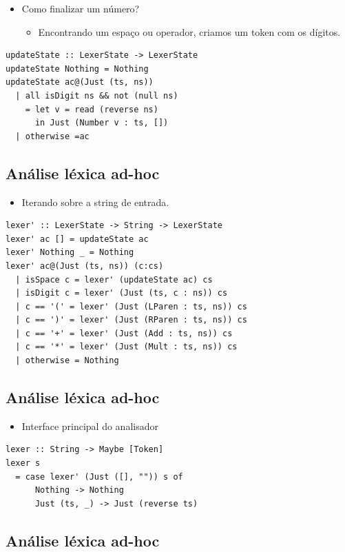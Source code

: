 \documentclass[11pt]{article}
\begin{document}
\begin{itemize}
\item Como finalizar um número?
\begin{itemize}
\item Encontrando um espaço ou operador, criamos um token
com os dígitos.
\end{itemize}
\end{itemize}

\begin{verbatim}
updateState :: LexerState -> LexerState
updateState Nothing = Nothing
updateState ac@(Just (ts, ns))
  | all isDigit ns && not (null ns)
    = let v = read (reverse ns)
      in Just (Number v : ts, [])
  | otherwise =ac
\end{verbatim}
\subsection*{Análise léxica ad-hoc}
\label{sec:org06bc440}

\begin{itemize}
\item Iterando sobre a string de entrada.
\end{itemize}

\begin{verbatim}
lexer' :: LexerState -> String -> LexerState
lexer' ac [] = updateState ac
lexer' Nothing _ = Nothing
lexer' ac@(Just (ts, ns)) (c:cs)
  | isSpace c = lexer' (updateState ac) cs
  | isDigit c = lexer' (Just (ts, c : ns)) cs
  | c == '(' = lexer' (Just (LParen : ts, ns)) cs
  | c == ')' = lexer' (Just (RParen : ts, ns)) cs
  | c == '+' = lexer' (Just (Add : ts, ns)) cs
  | c == '*' = lexer' (Just (Mult : ts, ns)) cs
  | otherwise = Nothing
\end{verbatim}
\subsection*{Análise léxica ad-hoc}
\label{sec:orgf855696}

\begin{itemize}
\item Interface principal do analisador
\end{itemize}

\begin{verbatim}
lexer :: String -> Maybe [Token]
lexer s
  = case lexer' (Just ([], "")) s of
      Nothing -> Nothing
      Just (ts, _) -> Just (reverse ts)
\end{verbatim}
\subsection*{Análise léxica ad-hoc}
\label{sec:org8978284}
\end{document}

